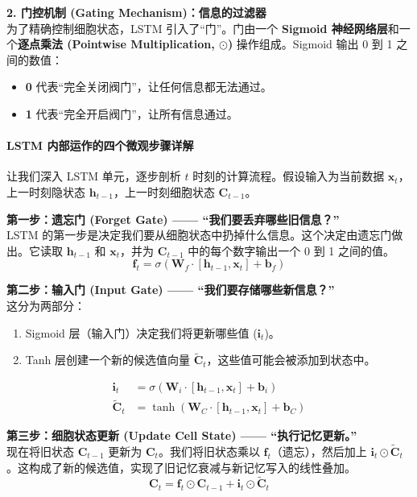 \textbf{2. 门控机制 (Gating Mechanism)：信息的过滤器} \\
为了精确控制细胞状态，LSTM 引入了“门”。门由一个 \textbf{Sigmoid 神经网络层}和一个\textbf{逐点乘法 (Pointwise Multiplication, $\odot$)} 操作组成。Sigmoid 输出 0 到 1 之间的数值：
\begin{itemize}
    \item \textbf{0} 代表“完全关闭阀门”，让任何信息都无法通过。
    \item \textbf{1} 代表“完全开启阀门”，让所有信息通过。
\end{itemize}

\paragraph{LSTM 内部运作的四个微观步骤详解}
让我们深入 LSTM 单元，逐步剖析 $t$ 时刻的计算流程。假设输入为当前数据 $\mathbf{x}_t$，上一时刻隐状态 $\mathbf{h}_{t-1}$，上一时刻细胞状态 $\mathbf{C}_{t-1}$。

\textbf{第一步：遗忘门 (Forget Gate) —— “我们要丢弃哪些旧信息？”} \\
LSTM 的第一步是决定我们要从细胞状态中扔掉什么信息。这个决定由遗忘门做出。它读取 $\mathbf{h}_{t-1}$ 和 $\mathbf{x}_t$，并为 $\mathbf{C}_{t-1}$ 中的每个数字输出一个 0 到 1 之间的值。
\begin{equation}
    \mathbf{f}_t = \sigma(\mathbf{W}_f \cdot [\mathbf{h}_{t-1}, \mathbf{x}_t] + \mathbf{b}_f)
\end{equation}

\textbf{第二步：输入门 (Input Gate) —— “我们要存储哪些新信息？”} \\
这分为两部分：
\begin{enumerate}
    \item Sigmoid 层（输入门）决定我们将更新哪些值 ($\mathbf{i}_t$)。
    \item Tanh 层创建一个新的候选值向量 $\tilde{\mathbf{C}}_t$，这些值可能会被添加到状态中。
\end{enumerate}
\begin{align}
    \mathbf{i}_t &= \sigma(\mathbf{W}_i \cdot [\mathbf{h}_{t-1}, \mathbf{x}_t] + \mathbf{b}_i) \\
    \tilde{\mathbf{C}}_t &= \tanh(\mathbf{W}_C \cdot [\mathbf{h}_{t-1}, \mathbf{x}_t] + \mathbf{b}_C)
\end{align}

\textbf{第三步：细胞状态更新 (Update Cell State) —— “执行记忆更新。”} \\
现在将旧状态 $\mathbf{C}_{t-1}$ 更新为 $\mathbf{C}_t$。我们将旧状态乘以 $\mathbf{f}_t$（遗忘），然后加上 $\mathbf{i}_t \odot \tilde{\mathbf{C}}_t$。这构成了新的候选值，实现了旧记忆衰减与新记忆写入的线性叠加。
\begin{equation}
    \mathbf{C}_t = \mathbf{f}_t \odot \mathbf{C}_{t-1} + \mathbf{i}_t \odot \tilde{\mathbf{C}}_t
\end{equation}

